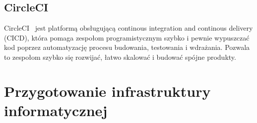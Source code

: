 	\subsection{CircleCI}
	CircleCI~\cite{circleci} jest platformą obsługującą continous integration and continous delivery (CICD), która pomaga zespołom programistycznym szybko i pewnie wypuszczać kod poprzez automatyzację procesu budowania, testowania i wdrażania. Pozwala to zespołom szybko się rozwijać, łatwo skalować i budować spójne produkty.

\section{Przygotowanie infrastruktury informatycznej}
	

